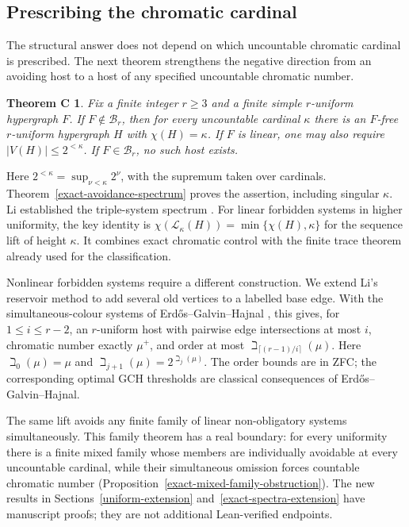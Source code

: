 \documentclass[a4paper,11pt,reqno]{amsart}
\theoremstyle{plain}
\newtheorem*{theoremC}{Theorem C}
\theoremstyle{definition}
\theoremstyle{remark}
\begin{document}
\subsection*{Prescribing the chromatic cardinal}
The structural answer does not depend on which uncountable chromatic
cardinal is prescribed.  The next theorem strengthens the negative
direction from an avoiding host to a host of any specified uncountable
chromatic number.

\begin{theoremC}
Fix a finite integer $r\ge3$ and a finite simple $r$-uniform
hypergraph $F$.  If $F\notin\mathcal B_r$, then for every uncountable
cardinal $\kappa$ there is an $F$-free $r$-uniform hypergraph $H$
with $\chi(H)=\kappa$.  If $F$ is linear, one may also require
$|V(H)|\le2^{<\kappa}$.  If $F\in\mathcal B_r$, no such host exists.
\end{theoremC}

Here $2^{<\kappa}=\sup_{\nu<\kappa}2^\nu$, with the supremum
taken over cardinals.  Theorem~\ref{exact-avoidance-spectrum} proves
the assertion, including singular $\kappa$.
Li established the triple-system spectrum \citep[Theorem~7.1]{li2026}.
For linear forbidden systems in higher uniformity, the key identity is
$\chi(\mathcal L_\kappa(H))=\min\{\chi(H),\kappa\}$ for the
sequence lift of height $\kappa$.  It combines exact chromatic control
with the finite trace theorem already used for the classification.

Nonlinear forbidden systems require a different construction.
We extend Li's reservoir method \citep[Section~6]{li2026} to add several
old vertices to a labelled base edge.  With the simultaneous-colour
systems of Erd\H{o}s--Galvin--Hajnal \citep[Corollary~12.3]{egh1975},
this gives, for $1\le i\le r-2$, an $r$-uniform host with pairwise
edge intersections at most $i$, chromatic number exactly $\mu^+$,
and order at most $\beth_{\lceil(r-1)/i\rceil}(\mu)$.
Here $\beth_0(\mu)=\mu$ and $\beth_{j+1}(\mu)=2^{\beth_j(\mu)}$.
The order bounds are in ZFC; the corresponding optimal GCH thresholds
are classical consequences of Erd\H{o}s--Galvin--Hajnal.

The same lift avoids any finite family of linear non-obligatory systems
simultaneously.  This family theorem has a real boundary: for every
uniformity there is a finite mixed family whose members are individually
avoidable at every uncountable cardinal, while their simultaneous
omission forces countable chromatic number
(Proposition~\ref{exact-mixed-family-obstruction}).
The new results in Sections~\ref{uniform-extension}
and~\ref{exact-spectra-extension} have manuscript proofs; they are
not additional Lean-verified endpoints.
\end{document}
